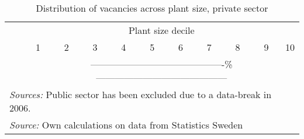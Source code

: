 \begin{table}[htbp]\centering
\def\sym#1{\ifmmode^{#1}\else\(^{#1}\)\fi}
\caption{Distribution of vacancies across plant size, private sector}
\label{tab:agg_imp:dist_over_time}
\begin{tabular}{lcccccccccc}
\hline
& \multicolumn{10}{c}{Plant size decile} \\
  &  1 & 2 & 3 & 4 & 5 & 6 & 7 & 8 & 9 & 10 \\ \hline
	& \multicolumn{10}{c}{-------------------------------------------\%------------------------------------------} \\

\hline \hline
\multicolumn{10}{l}{\footnotesize \emph{Sources:} Public sector has been excluded due to a data-break in 2006.} \\
\multicolumn{10}{l}{\footnotesize \emph{Source:} Own calculations on data from Statistics Sweden}
\end{tabular}
\end{table}
